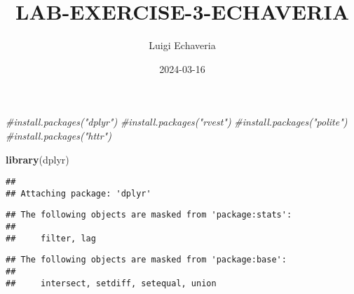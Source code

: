 \documentclass[
]{article}
\title{LAB-EXERCISE-3-ECHAVERIA}
\author{Luigi Echaveria}
\date{2024-03-16}
\newenvironment{Shaded}{\begin{snugshade}}{\end{snugshade}}
\newcommand{\CommentTok}[1]{\textcolor[rgb]{0.56,0.35,0.01}{\textit{#1}}}
\newcommand{\FunctionTok}[1]{\textcolor[rgb]{0.13,0.29,0.53}{\textbf{#1}}}
\newcommand{\NormalTok}[1]{#1}
\begin{document}
\maketitle

\begin{Shaded}
\begin{Highlighting}[]
\CommentTok{\#install.packages("dplyr")}
\CommentTok{\#install.packages("rvest")}
\CommentTok{\#install.packages("polite")}
\CommentTok{\#install.packages("httr")}

\FunctionTok{library}\NormalTok{(dplyr)}
\end{Highlighting}
\end{Shaded}

\begin{verbatim}
## 
## Attaching package: 'dplyr'
\end{verbatim}

\begin{verbatim}
## The following objects are masked from 'package:stats':
## 
##     filter, lag
\end{verbatim}

\begin{verbatim}
## The following objects are masked from 'package:base':
## 
##     intersect, setdiff, setequal, union
\end{verbatim}
\end{document}
